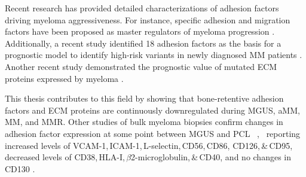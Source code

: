 Recent research has provided detailed characterizations of adhesion factors
driving myeloma aggressiveness. For instance, specific adhesion and migration
factors have been proposed as master regulators of myeloma progression%
\cite{shenProgressionSignatureUnderlies2021}.%
Additionally, a recent study identified 18 adhesion factors as the basis for a
prognostic model to identify high-risk variants in newly diagnosed MM patients
\cite{huDevelopmentCellAdhesionbased2024}. Another recent study demonstrated the
prognostic value of mutated \ac{ECM} proteins expressed by myeloma
\cite{eversPrognosticValueExtracellular2023}.

This thesis contributes to this field by showing that bone-retentive adhesion
factors and \ac{ECM} proteins are continuously downregulated during \ac{MGUS},
\ac{aMM}, \ac{MM}, and \ac{MMR}. Other studies of bulk myeloma biopsies confirm
changes in adhesion factor expression at some point between \ac{MGUS} and
\ac{PCL}%
\,%
,~%
reporting %
increased levels of VCAM-1,\,ICAM-1,\,L-selectin,\,CD56,\,CD86,
CD126,\,\&\,CD95, %
decreased levels of CD38,\,HLA-I,\,$\beta$2-microglobulin,\,\&\,CD40, and %
no changes in CD130 %
\cite{terposIncreasedCirculatingVCAM12016, perez-andresClonalPlasmaCells2005}.

